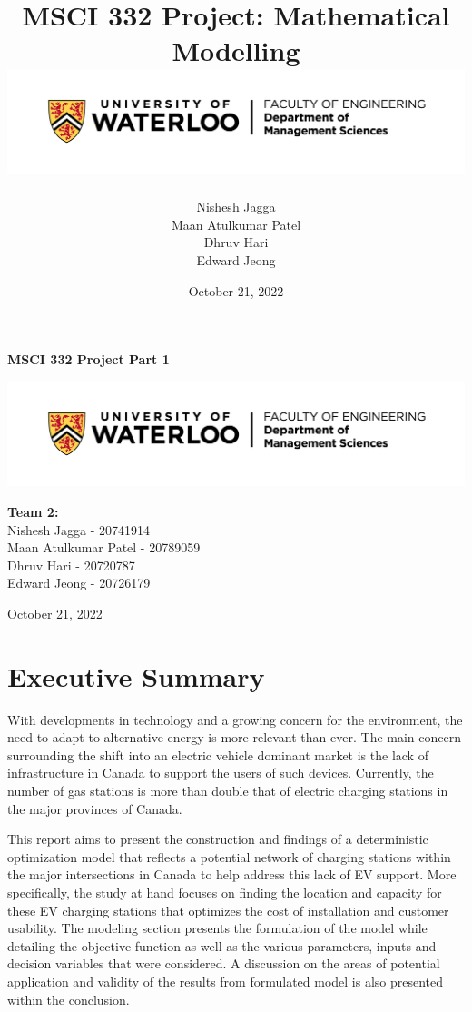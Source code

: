 \documentclass[12pt, fleqn]{article}
\title{
    {MSCI 332 Project: Mathematical Modelling}\\
    {\includegraphics[scale=0.5]{uw_logo.png}}
}
\author{
    {Nishesh Jagga}\\
    {Maan Atulkumar Patel}\\
    {Dhruv Hari}\\
    {Edward Jeong}\\
}
\date{October 21, 2022}
\begin{document}
\begin{titlepage}
    \begin{center}
        \vspace*{3cm}

        \textbf{\huge MSCI 332 Project Part 1}

        \vspace{1cm}

        \includegraphics[width=1\textwidth]{uw_logo.png}

        \vfill

        \textbf{Team 2:}\\
        Nishesh Jagga - 20741914\\
        Maan Atulkumar Patel - 20789059\\
        Dhruv Hari - 20720787\\
        Edward Jeong - 20726179\\


        \vspace{2cm}

        October 21, 2022

        \vspace{3cm}
    \end{center}
\end{titlepage}

\raggedright
\break

\tableofcontents


\break
\section{Executive Summary}

With developments in technology and a growing concern for the environment, the need to adapt to alternative energy is more relevant than ever. The main concern surrounding the shift into an electric vehicle dominant market is the lack of infrastructure in Canada to support the users of such devices. Currently, the number of gas stations is more than double that of electric charging stations in the major provinces of Canada.

\medskip

This report aims to present the construction and findings of a deterministic optimization model that reflects a potential network of charging stations within the major intersections in Canada to help address this lack of EV support.  More specifically, the study at hand focuses on finding the location and capacity for these EV charging stations that optimizes the cost of installation and customer usability. The modeling section presents the formulation of the model while detailing the objective function as well as the various parameters, inputs and decision variables that were considered. A discussion on the areas of potential application and validity of the results from formulated model is also presented within the conclusion.
\end{document}
